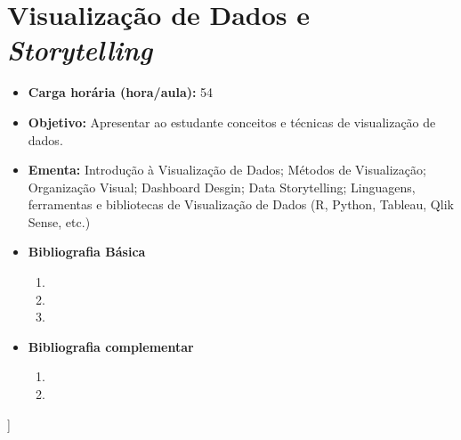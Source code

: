 \documentclass[11pt,fleqn]{book} %
\begin{document}
\section{Visualização de Dados e \textit{Storytelling}}\label{6_visstory}
\begin{itemize}
	\item \textbf{Carga horária (hora/aula):} 54
	\item \textbf{Objetivo:} Apresentar ao estudante conceitos e técnicas de visualização de dados.
	\item \textbf{Ementa:} 
	Introdução à Visualização de Dados;
	Métodos de Visualização;
	Organização Visual;
	Dashboard Desgin;
	Data Storytelling;
	Linguagens, ferramentas e bibliotecas de Visualização de Dados (R, Python, Tableau, Qlik Sense, etc.)
	\item \textbf{Bibliografia Básica}
	\begin{enumerate}
		\item 
		\item 
		\item 
	\end{enumerate}
	\item \textbf{Bibliografia complementar}
	\begin{enumerate}
		\item 
		\item
	\end{enumerate} 	
\end{itemize}
]

\newpage
\end{document}
